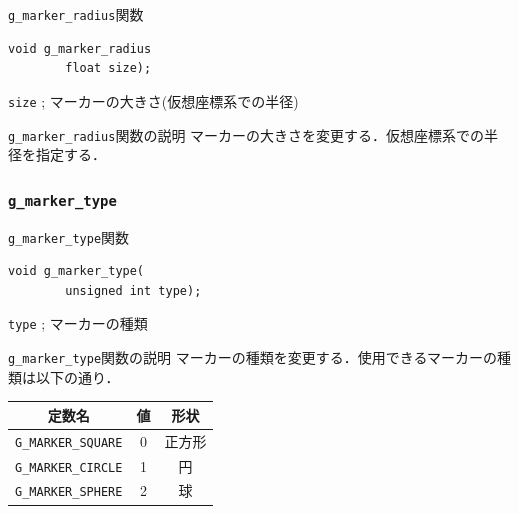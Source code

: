 \documentclass[platex,a4paper,12pt]{jsarticle}%
\begin{document}
\begin{itembox}[l]{\texttt{g\_marker\_radius}関数}
\begin{verbatim}
void g_marker_radius
        float size);
\end{verbatim}
\verb|size| ; マーカーの大きさ(仮想座標系での半径)\\
\end{itembox}

\begin{itembox}[l]{\texttt{g\_marker\_radius}関数の説明}
	マーカーの大きさを変更する．仮想座標系での半径を指定する．
\end{itembox}

\clearpage

\subsubsection{\texttt{g\_marker\_type}}

\begin{itembox}[l]{\texttt{g\_marker\_type}関数}
\begin{verbatim}
void g_marker_type(
        unsigned int type);
\end{verbatim}
\verb|type| ; マーカーの種類\\
\end{itembox}

\begin{itembox}[l]{\texttt{g\_marker\_type}関数の説明}
マーカーの種類を変更する．使用できるマーカーの種類は以下の通り．
\begin{center}
\begin{tabular}{|c|c|c|}
	\hline 
	定数名 & 値 & 形状 \\ 
	\hline 
	\verb|G_MARKER_SQUARE| & 0 & 正方形 \\ 
	\hline 
	\verb|G_MARKER_CIRCLE| & 1 & 円 \\ 
	\hline 
	\verb|G_MARKER_SPHERE| & 2 & 球 \\ 
	\hline 
\end{tabular}
\end{center}
\end{itembox}
\end{document}
